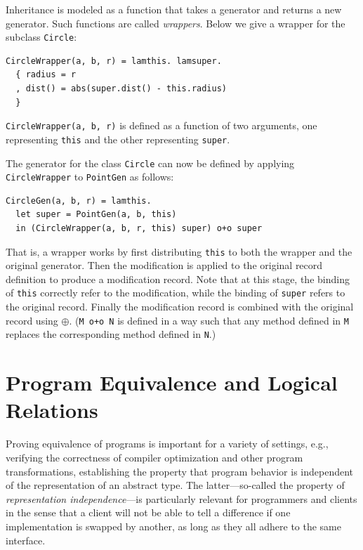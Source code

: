 Inheritance is modeled as a function that takes a generator and returns a new
generator. Such functions are called \textit{wrappers}. Below we give a wrapper
for the subclass \lstinline{Circle}:
\begin{lstlisting}[language=simple]
CircleWrapper(a, b, r) = lamthis. lamsuper.
  { radius = r
  , dist() = abs(super.dist() - this.radius)
  }
\end{lstlisting}
\lstinline{CircleWrapper(a, b, r)} is defined as a function of two arguments,
one representing \lstinline{this} and the other representing \lstinline{super}.

The generator for the class \lstinline{Circle} can now be defined by
applying \lstinline{CircleWrapper} to \lstinline{PointGen} as follows:
\begin{lstlisting}[language=simple]
CircleGen(a, b, r) = lamthis.
  let super = PointGen(a, b, this)
  in (CircleWrapper(a, b, r, this) super) o+o super
\end{lstlisting}
That is, a wrapper works by first distributing \lstinline{this} to both the
wrapper and the original generator. Then the modification is applied to the
original record definition to produce a modification record. Note that at this
stage, the binding of \lstinline{this} correctly refer to the modification,
while the binding of \lstinline{super} refers to the original record. Finally
the modification record is combined with the original record using $\oplus$.
(\lstinline{M o+o N} is defined in a way such that any method defined in \lstinline{M}
replaces the corresponding method defined in \lstinline{N}.)


\section{Program Equivalence and Logical Relations}

\label{sec:bg:lr}


Proving equivalence of programs is important for a variety of settings, e.g.,
verifying the correctness of compiler optimization and other program
transformations, establishing the property that program behavior is independent
of the representation of an abstract type. The latter---so-called the property of
\textit{representation independence}---is particularly relevant for programmers
and clients in the sense that a client will not be able to tell a difference if
one implementation is swapped by another, as long as they all adhere to the same
interface.

